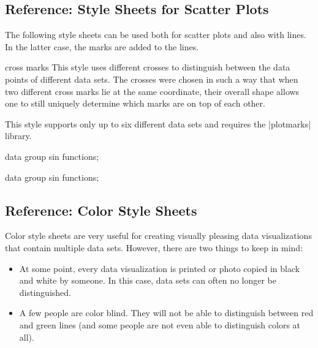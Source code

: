 \subsection{Reference: Style Sheets for Scatter Plots}

The following style sheets can be used both for scatter plots and also with
lines. In the latter case, the marks are added to the lines.

\begin{stylesheet}{cross marks}
    This style uses different crosses to distinguish between the data points of
    different data sets. The crosses were chosen in such a way that when two
    different cross marks lie at the same coordinate, their overall shape
    allows one to still uniquely determine which marks are on top of each
    other.

    This style supports only up to six different data sets and requires the
    |plotmarks| library.
\begin{codeexample}[width=10cm]
\tikz \datavisualization [
  visualize as scatter/.list=
    {1,2,3,4,5,6,7,8},
  example visualization,
  style sheet=cross marks]
data group {sin functions};
\end{codeexample}
\begin{codeexample}[width=10cm]
\tikz \datavisualization [
  visualize as smooth line/.list=
    {1,2,3,4,5,6,7,8},
  example visualization,
  style sheet=cross marks]
data group {sin functions};
\end{codeexample}
\end{stylesheet}


\subsection{Reference: Color Style Sheets}

Color style sheets are very useful for creating visually pleasing data
visualizations that contain multiple data sets. However, there are two things
to keep in mind:
%
\begin{itemize}
    \item At some point, every data visualization is printed or photo copied in
        black and white by someone. In this case, data sets can often no longer
        be distinguished.
    \item A few people are color blind. They will not be able to distinguish
        between red and green lines (and some people are not even able to
        distinguish colors at all).
\end{itemize}

